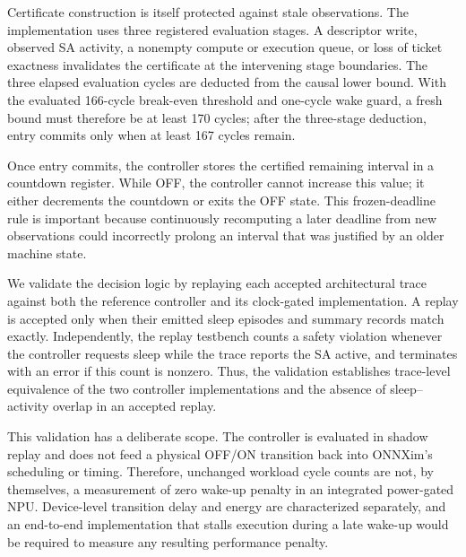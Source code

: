 Certificate construction is itself protected against stale observations.
The implementation uses three registered evaluation stages. A descriptor
write, observed SA activity, a nonempty compute or execution queue, or loss of
ticket exactness invalidates the certificate at the intervening stage
boundaries. The three elapsed evaluation cycles are deducted from the causal
lower bound. With the evaluated 166-cycle break-even threshold and one-cycle
wake guard, a fresh bound must therefore be at least 170 cycles; after the
three-stage deduction, entry commits only when at least 167 cycles remain.

Once entry commits, the controller stores the certified remaining interval in
a countdown register. While OFF, the controller cannot increase this value;
it either decrements the countdown or exits the OFF state. This frozen-deadline
rule is important because continuously recomputing a later deadline from new
observations could incorrectly prolong an interval that was justified by an
older machine state.

We validate the decision logic by replaying each accepted architectural trace
against both the reference controller and its clock-gated implementation. A
replay is accepted only when their emitted sleep episodes and summary records
match exactly. Independently, the replay testbench counts a safety violation
whenever the controller requests sleep while the trace reports the SA active,
and terminates with an error if this count is nonzero. Thus, the validation
establishes trace-level equivalence of the two controller implementations and
the absence of sleep--activity overlap in an accepted replay.

This validation has a deliberate scope. The controller is evaluated in
shadow replay and does not feed a physical OFF/ON transition back into
ONNXim's scheduling or timing. Therefore, unchanged workload cycle counts are
not, by themselves, a measurement of zero wake-up penalty in an integrated
power-gated NPU. Device-level transition delay and energy are characterized
separately, and an end-to-end implementation that stalls execution during a
late wake-up would be required to measure any resulting performance penalty.
